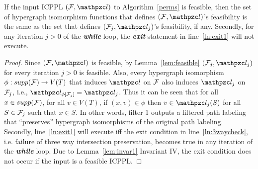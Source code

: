 \begin{lemma}
  \label{lem:noexit1}
  If the input ICPPL $(\cF, \cl)$ to Algorithm~\ref{perms} is
  feasible, then the set of hypergraph isomorphism functions that
  defines $(\cF, \cl)$'s feasibility is the same as the set that
  defines $(\cF_j, \cl_j)$'s feasibility, if any.  Secondly, for any
  iteration $j > 0$ of the {\em \bf while} loop, the {\em \bf exit}
  statement in line~\ref{ln:exit1} will not execute.
\end{lemma}
\begin{proof}
  Since $(\cF,\cl)$ is feasible, by Lemma~\ref{lem:feasible}
  $(\cF_j,\cl_j)$ for every iteration $j > 0$ is
  feasible.  %
  Also, every hypergraph isomorphism $\phi: supp({\cal F}) \rightarrow
  V(T)$ that induces $\cl$ on ${\cal F}$ also induces $\cl_{j}$ on
  ${\cal F}_{j}$, i.e., $\cl_{\phi[\cF_j]} = \cl_j$. Thus it can be seen
  that for all $x \in supp({\cal F})$, for all $v \in V(T)$, if $(x,v) \in
  \phi$ then $v \in \cl_{j}(S)$ for all $S \in {\cal F}_{j}$ such that $x
  \in S$.
  In other words, filter 1 outputs a filtered path labeling that
  ``preserves''
  hypergraph isomorphisms of the original path labeling.\\
  Secondly, line~\ref{ln:exit1} will execute iff the exit condition in
  line~\ref{ln:3waycheck}, i.e. failure of three way intersection
  preservation, becomes true in any iteration of the {\em \bf while}
  loop.  Due to Lemma~\ref{lem:invar1} Invariant IV, the exit
  condition does not occur if the input is a feasible ICPPL.%



\end{proof}
